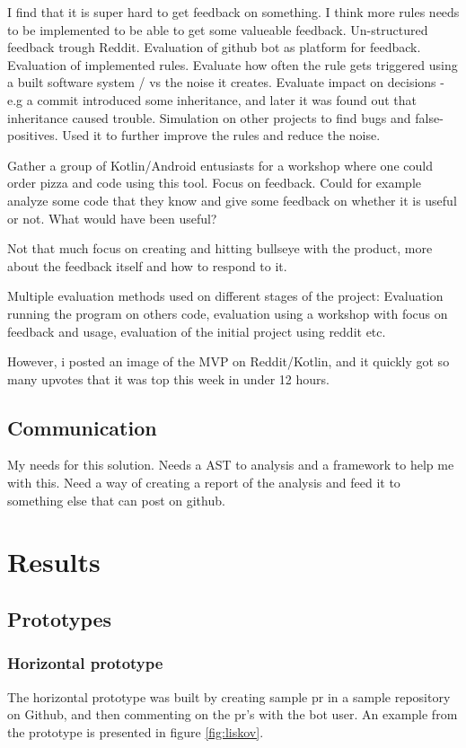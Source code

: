 \documentclass{article}
\begin{document}
I find that it is super hard to get feedback on something. I think more rules needs to be implemented to be able to get some valueable feedback. Un-structured feedback trough Reddit. Evaluation of github bot as platform for feedback. Evaluation of implemented rules. Evaluate how often the rule gets triggered using a built software system / vs the noise it creates. Evaluate impact on decisions - e.g a commit introduced some inheritance, and later it was found out that inheritance caused trouble. Simulation on other projects to find bugs and false-positives. Used it to further improve the rules and reduce the noise.

Gather a group of Kotlin/Android entusiasts for a workshop where one could order pizza and code using this tool. Focus on feedback. Could for example analyze some code that they know and give some feedback on whether it is useful or not. What would have been useful?

Not that much focus on creating and hitting bullseye with the product, more about the feedback itself and how to respond to it.

Multiple evaluation methods used on different stages of the project: Evaluation running the program on others code, evaluation using a workshop with focus on feedback and usage, evaluation of the initial project using reddit etc.

However, i posted an image of the MVP on Reddit/Kotlin, and it quickly got so many upvotes that it was top this week in under 12 hours. 

\subsection{Communication}


My needs for this solution. Needs a AST to analysis and a framework to help me with this. Need a way of creating a report of the analysis and feed it to something else that can post on github. 



\section{Results}
\subsection{Prototypes}
\subsubsection{Horizontal prototype}
The horizontal prototype was built by creating sample \gls{pr} in a sample repository on Github\cite{sample-repository}, and then commenting on the \gls{pr}'s with the bot user. An example from the prototype is presented in figure \ref{fig:liskov}. 
\end{document}
